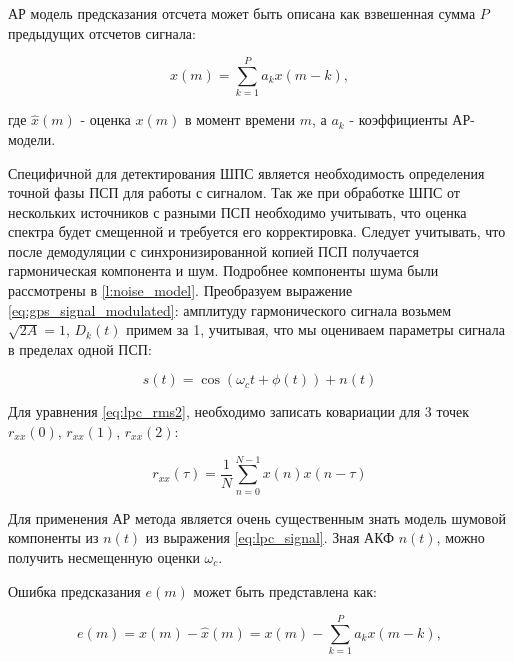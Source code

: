 АР модель предсказания отсчета может быть описана как взвешенная сумма ${P}$ предыдущих отсчетов сигнала:
\begin{center}
\begin{equation}
	\label{eq:lpc_forecast}
	\hat{x}(m) = \sum \limits_{k=1}^P a_k x(m-k),
\end{equation}
\end{center}
где ${\hat{x}(m)}$ - оценка ${x(m)}$ в момент времени ${m}$, а ${a_k}$ - коэффициенты АР-модели.

Специфичной для детектирования ШПС является необходимость определения точной фазы ПСП
для работы с сигналом. Так же при обработке ШПС от нескольких источников с разными ПСП необходимо учитывать,
что оценка спектра будет смещенной и требуется его корректировка. Следует учитывать, что после демодуляции
с синхронизированной копией ПСП получается гармоническая компонента и шум. Подробнее компоненты шума были
рассмотрены в \ref{l:noise_model}. Преобразуем выражение \ref{eq:gps_signal_modulated}: амплитуду гармонического
сигнала возьмем ${\sqrt{2A} = 1}$, ${D_k(t)}$ примем за 1, учитывая, что мы оцениваем параметры сигнала в пределах одной
ПСП:
\begin{center}
\begin{equation}
	\label{eq:lpc_signal}
	s(t) = \cos(\omega_{c}t + \phi(t)) + n(t)
\end{equation}
\end{center}

Для уравнения \ref{eq:lpc_rms2}, необходимо записать ковариации для 3 точек
${r_{xx}(0)}$, ${r_{xx}(1)}$, ${r_{xx}(2)}$:

\begin{center}
\begin{equation}
	\label{eq:lpc_cov}
	{r_{xx}(\tau) = \frac{1}{N} \sum \limits_{n=0}^{N-1} x(n) x(n-\tau)}
\end{equation}
\end{center}

Для применения АР метода является очень существенным знать модель шумовой компоненты из ${n(t)}$ из выражения
\ref{eq:lpc_signal}. Зная АКФ ${n(t)}$, можно получить несмещенную оценки ${\omega_c}$.

Ошибка предсказания ${e(m)}$ может быть представлена как:
\begin{center}
\begin{equation}
	\label{eq:lpc_error}
	e(m) = x(m) - \hat{x}(m) = x(m) - \sum \limits_{k=1}^P a_k x(m-k),
\end{equation}
\end{center}

